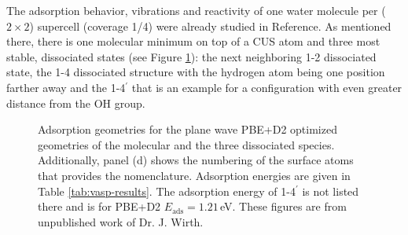 \documentclass[11pt,DIV=13,BCOR=5mm,a4paper,headinclude]{scrbook}
\begin{document}
The adsorption behavior, vibrations and reactivity of one water  molecule per ($2\times 2$) supercell (coverage 1/4) were already studied in Reference\cite{WirthJPCC2012}.
As mentioned there, there is one molecular minimum on top of a CUS atom and three most stable, dissociated states (see Figure \ref{abb:0001_ads}): the next neighboring 1-2 dissociated state, the 1-4 dissociated structure with the hydrogen atom being one position farther away and the 1-4$^\prime$ that is an example for a configuration with even greater distance from the OH group.
\begin{figure} [!ht]
\centering
{}
         \quad
{}
 \quad
{}
 \quad
{}
\caption{Adsorption geometries for the plane wave PBE+D2 optimized geometries of the molecular and the three dissociated species.
Additionally, panel (d) shows the numbering of the surface atoms that provides the nomenclature.
Adsorption energies are given in Table \ref{tab:vasp-results}.
The adsorption energy of 1-4$^\prime$ is not listed there and is for PBE+D2 $E_\textrm{ads}=1.21\,$eV.
These figures are from unpublished work of Dr. J. Wirth.}
       \label{abb:0001_ads}
\end{figure}
\end{document}

